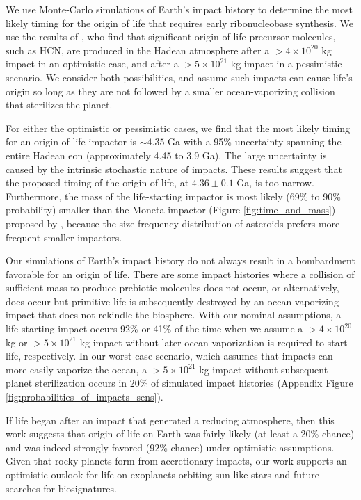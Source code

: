 \documentclass[manuscript]{aastex63}
\begin{document}
We use Monte-Carlo simulations of Earth's impact history to determine the most likely timing for the origin of life that requires early ribonucleobase synthesis. We use the results of \citet{Wogan_2023}, who find that significant origin of life precursor molecules, such as HCN, are produced in the Hadean atmosphere after a $> 4 \times 10^{20}$ kg impact in an optimistic case, and after a $> 5 \times 10^{21}$ kg impact in a pessimistic scenario. We consider both possibilities, and assume such impacts can cause life's origin so long as they are not followed by a smaller ocean-vaporizing collision that sterilizes the planet.

For either the optimistic or pessimistic cases, we find that the most likely timing for an origin of life impactor is $\sim 4.35$ Ga with a 95\% uncertainty spanning the entire Hadean eon (approximately 4.45 to 3.9 Ga). The large uncertainty is caused by the intrinsic stochastic nature of impacts. These results suggest that the \citet{Benner_2020} proposed timing of the origin of life, at $4.36 \pm 0.1$ Ga, is too narrow. Furthermore, the mass of the life-starting impactor is most likely (69\% to 90\% probability) smaller than the Moneta impactor (Figure \ref{fig:time_and_mass}) proposed by \citet{Benner_2020}, because the size frequency distribution of asteroids prefers more frequent smaller impactors.

Our simulations of Earth's impact history do not always result in a bombardment favorable for an origin of life. There are some impact histories where a collision of sufficient mass to produce prebiotic molecules does not occur, or alternatively, does occur but primitive life is subsequently destroyed by an ocean-vaporizing impact that does not rekindle the biosphere. With our nominal assumptions, a life-starting impact occurs 92\% or 41\% of the time when we assume a $> 4 \times 10^{20}$ kg or $> 5 \times 10^{21}$ kg impact without later ocean-vaporization is required to start life, respectively. In our worst-case scenario, which assumes that impacts can more easily vaporize the ocean, a $> 5 \times 10^{21}$ kg impact without subsequent planet sterilization occurs in 20\% of simulated impact histories (Appendix Figure \ref{fig:probabilities_of_impacts_sens}).

If life began after an impact that generated a reducing atmosphere, then this work suggests that origin of life on Earth was fairly likely (at least a 20\% chance) and was indeed strongly favored (92\% chance) under optimistic assumptions. Given that rocky planets form from accretionary impacts, our work supports an optimistic outlook for life on exoplanets orbiting sun-like stars and future searches for biosignatures. 
\end{document}
